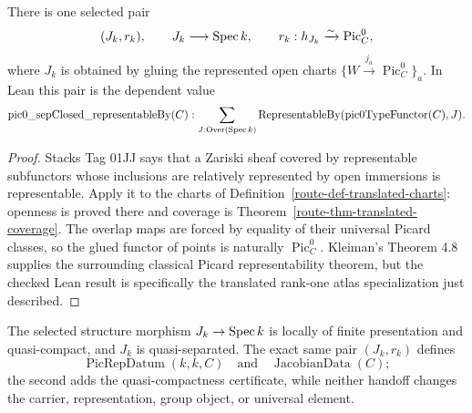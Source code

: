 \begin{theorem}
  \label{route-thm-sepclosed-representability}
  \leanok

  There is one selected pair
  \[
    (J_k,r_k),\qquad J_k\longrightarrow\operatorname{Spec} k,\qquad
    r_k:h_{J_k}\xrightarrow{\sim}\operatorname{Pic}^0_C,
  \]
  where \(J_k\) is obtained by gluing the represented open charts
  \(\{W\xrightarrow{j_a}\operatorname{Pic}^0_C\}_a\).
  In Lean this pair is the dependent value
  \[
    \operatorname{pic0\_sepClosed\_representableBy}(C):
    \sum_{J:\mathrm{Over}(\operatorname{Spec} k)}
      \operatorname{RepresentableBy}(\operatorname{pic0TypeFunctor}(C),J).
  \]
\end{theorem}

\begin{proof}
  Stacks Tag 01JJ says that a Zariski sheaf covered by representable
  subfunctors whose inclusions are relatively represented by open immersions
  is representable.  Apply it to the charts of
  Definition~\ref{route-def-translated-charts}: openness is proved there and
  coverage is Theorem~\ref{route-thm-translated-coverage}.  The overlap maps
  are forced by equality of their universal Picard classes, so the glued
  functor of points is naturally \(\operatorname{Pic}^0_C\).
  Kleiman's Theorem 4.8 supplies the surrounding classical Picard
  representability theorem, but the checked Lean result is specifically the
  translated rank-one atlas specialization just described.
\end{proof}

\begin{theorem}
  \label{route-thm-sepclosed-finiteness}
  \leanok

  The selected structure morphism \(J_k\to\operatorname{Spec} k\) is locally of finite
  presentation and quasi-compact, and \(J_k\) is quasi-separated.  The exact
  same pair \((J_k,r_k)\) defines
  \[
    \operatorname{PicRepDatum}(k,k,C)
    \quad\text{and}\quad
    \operatorname{JacobianData}(C);
  \]
  the second adds the quasi-compactness certificate, while neither handoff
  changes the carrier, representation, group object, or universal element.
\end{theorem}

